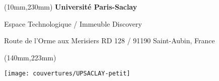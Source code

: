 \setlength\fboxsep{3mm}
\begin{center}
\end{center}
\vspace*{0mm}
% 
\begin{center}
  \normalsize
{}
\end{center}
% 
\begin{textblock*}{161mm}(10mm,230mm) %
%
\color{bordeau}
{\bf\noindent Université Paris-Saclay	         }

\noindent Espace Technologique / Immeuble Discovery

\noindent Route de l’Orme aux Merisiers RD 128 / 91190 Saint-Aubin, France
\end{textblock*}


\begin{textblock*}{20mm}(140mm,223mm) %

\texttt{[image: couvertures/UPSACLAY-petit]}
\end{textblock*}

